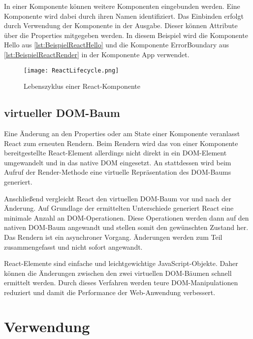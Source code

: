 In einer Komponente können weitere Komponenten eingebunden werden. Eine Komponente wird dabei durch ihren Namen identifiziert. Das Einbinden erfolgt durch Verwendung der Komponente in der Ausgabe. Dieser können Attribute über die Properties mitgegeben werden.\autocites[vgl.][111\psqq]{Zeigermann.2016} In diesem Beispiel wird die Komponente Hello aus \autoref{lst:BeispielReactHello}  und die Komponente ErrorBoundary aus \autoref{lst:BeispielReactRender} in der Komponente App verwendet. 


\begin{figure}
	\centering
	\texttt{[image: ReactLifecycle.png]}
	\caption{Lebenszyklus einer  React-Komponente} 
	\label{fig:LifecyleComponent}
\end{figure}



\subsection{virtueller DOM-Baum }
\label{Rendern}
Eine Änderung an den Properties oder am State einer Komponente veranlasst React zum erneuten Rendern. Beim Rendern wird das von einer Komponente bereitgestellte React-Element allerdings nicht direkt in ein DOM-Element umgewandelt und in das native DOM eingesetzt. An stattdessen wird beim Aufruf der Render-Methode eine virtuelle Repräsentation des DOM-Baums generiert.

Anschließend vergleicht React den virtuellen DOM-Baum vor und nach der Änderung. Auf Grundlage der ermittelten Unterschiede generiert React eine minimale Anzahl an DOM-Operationen.  Diese Operationen werden dann auf den nativen DOM-Baum angewandt und stellen somit den gewünschten Zustand her. Das Rendern ist ein asynchroner Vorgang. Änderungen werden zum Teil zusammengefasst und nicht sofort angewandt.

React-Elemente sind einfache und leichtgewichtige JavaScript-Objekte. Daher können die Änderungen zwischen den zwei virtuellen DOM-Bäumen schnell ermittelt werden. Durch dieses Verfahren werden teure DOM-Manipulationen reduziert und damit die Performance der Web-Anwendung verbessert.\autocites[vgl.][23\psq,60\psq,90\psq]{Zeigermann.2016}[vgl.][53\psq]{Stefanov.2017}[vgl.][]{Facebook.2018}
\section{Verwendung}


